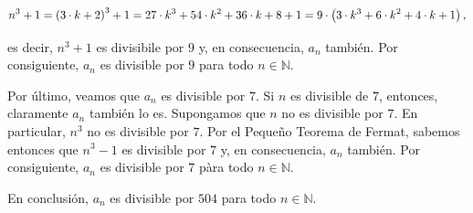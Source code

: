 \begin{equation}
  n^3+1=\left(3\cdot k+2\right)^3+1=27\cdot k^3+54\cdot k^2+36\cdot k+8+1=9\cdot\left(3\cdot k^3+6\cdot k^2+4\cdot k+1\right),
\end{equation}

es decir, $n^3+1$ es divisibile por $9$ y, en consecuencia, $a_n$ también. Por consiguiente, $a_n$ es divisible por $9$ para todo $n\in\mathbb{N}$.

Por último, veamos que $a_n$ es divisible por $7$. Si $n$ es divisible de $7$, entonces, claramente $a_n$ también lo es. Supongamos que $n$ no es divisible por $7$. En particular, $n^3$ no es divisible por $7$. Por el Pequeño Teorema de Fermat, sabemos entonces que $n^3-1$ es divisible por $7$ y, en consecuencia, $a_n$ también. Por consiguiente, $a_n$ es divisible por $7$ pàra todo $n\in\mathbb{N}$.

En conclusión, $a_n$ es divisible por $504$ para todo $n\in\mathbb{N}$.